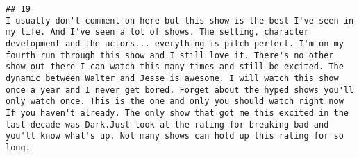 \documentclass[
]{article}
\begin{document}
\begin{verbatim}
## 19                                                                                                                                                                                                                                                                                                                                                                                                                                                                                                                                                                                                                                                                                                                                                                                                                                                                                                                                                                                                                                                                                                                                                                                                                                                                                                                                                                                                                             I usually don't comment on here but this show is the best I've seen in my life. And I've seen a lot of shows. The setting, character development and the actors... everything is pitch perfect. I'm on my fourth run through this show and I still love it. There's no other show out there I can watch this many times and still be excited. The dynamic between Walter and Jesse is awesome. I will watch this show once a year and I never get bored. Forget about the hyped shows you'll only watch once. This is the one and only you should watch right now If you haven't already. The only show that got me this excited in the last decade was Dark.Just look at the rating for breaking bad and you'll know what's up. Not many shows can hold up this rating for so long.

\end{verbatim}
\end{document}
